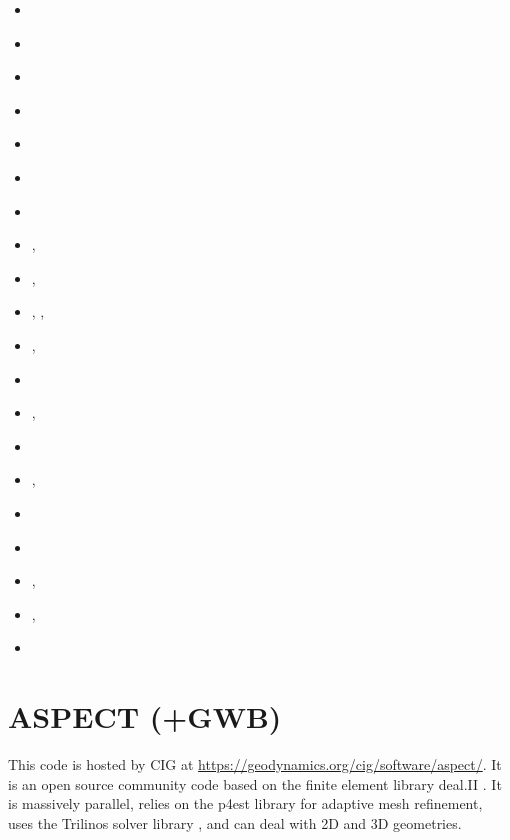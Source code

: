\begin{small}
\begin{itemize}
\item[\nineteenninetysix] \textcite{hach96b}
\item[\nineteenninetyseven] \textcite{hajc97}
\item[\nineteenninetyeight] \textcite{huhc98}
\item[\nineteenninetynine] \textcite{vajh99}
\item[\twothousand] \textcite{lecd00}
\item[\twothousandone] \textcite{chzh01}
\item[\twothousandthree] \textcite{prch03}
\item[\twothousandfour] \textcite{gocl04}, \textcite{bejh04}
\item[\twothousandsix] \textcite{vech06}, \textcite{golc06}
\item[\twothousandeight] \textcite{boht08a,boht08b}, \textcite{gomm08}, \textcite{netv08}
\item[\twothousandtwelve] \textcite{gech12}, \textcite{gigh12}
\item[\twothousandthirteen] \textcite{wahd13}
\item[\twothousandfourteen] \textcite{cehg14}, \textcite{mehn14}
\item[\twothousandfifteen] \textcite{ceag15}
\item[\twothousandeighteen] \textcite{cegm18}, \textcite{gehn18}
\item[\twothousandnineteen] \textcite{tamg19}
\item[\twothousandtwenty] \textcite{cear20}
\item[\twothousandtwentyone] \textcite{siht21}, \textcite{ceha21} 
\item[\twothousandtwentytwo] \textcite{gefp22}, \textcite{gefp22} 
\item[\twothousandtwentythree] \textcite{matv23}
\end{itemize}
\end{small}

\section{ASPECT (+GWB)} 

This code is hosted by CIG at \url{https://geodynamics.org/cig/software/aspect/}. 
It is an open source community code based on the finite element library deal.II \cite{bahk07,arbc19,arbd20}. 
It is massively parallel, relies on the p4est library for adaptive mesh refinement,
uses the Trilinos solver library \cite{hewi12}, and can deal with 2D and 3D geometries. 

